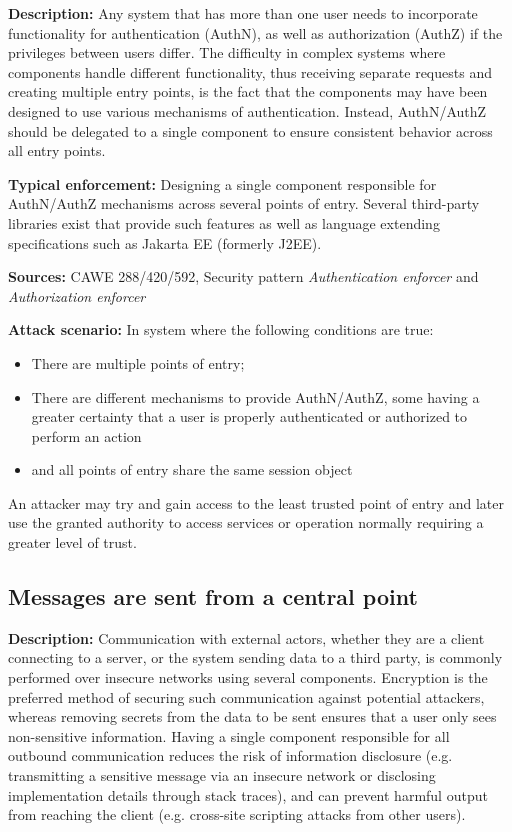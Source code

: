  \textbf{Description:} Any system that has more than one user needs to incorporate functionality for authentication (AuthN), as well as authorization (AuthZ) if the privileges between users differ. The difficulty in complex systems where components handle different functionality, thus receiving separate requests and creating multiple entry points, is the fact that the components may have been designed to use various mechanisms of authentication. Instead, AuthN/AuthZ should be delegated to a single component to ensure consistent behavior across all entry points. 
 
 \textbf{Typical enforcement:} Designing a single component responsible for AuthN/AuthZ mechanisms across several points of entry. Several third-party libraries exist that provide such features as well as language extending specifications such as Jakarta EE (formerly J2EE). 
 
 \textbf{Sources:} CAWE 288/420/592, Security pattern \textit{Authentication enforcer} and \textit{Authorization enforcer}
 
 \textbf{Attack scenario:} In system where the following conditions are true:
 
 \begin{itemize}
     \item There are multiple points of entry; 
     \item There are different mechanisms to provide AuthN/AuthZ, some having a greater certainty that a user is properly authenticated or authorized to perform an action
     \item and all points of entry share the same session object
 \end{itemize}
 
  An attacker may try and gain access to the least trusted point of entry and later use the granted authority to access services or operation normally requiring a greater level of trust.

\subsection{Messages are sent from a central point} 

\textbf{Description:} 
Communication with external actors, whether they are a client connecting to a server, or the system sending data to a third party, is commonly performed over insecure networks using several components. Encryption is the preferred method of securing such communication against potential attackers, whereas removing secrets from the data to be sent ensures that a user only sees non-sensitive information. Having a single component responsible for all outbound communication reduces the risk of information disclosure (e.g. transmitting a sensitive message via an insecure network or disclosing implementation details through stack traces), and can prevent harmful output from reaching the client (e.g. cross-site scripting attacks from other users). 
 
